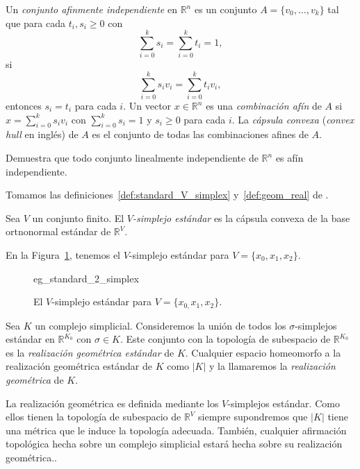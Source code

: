 \documentclass{standalone}
\begin{document}
	\begin{definition}\label{def:affine_ind_set}
		Un \emph{conjunto afinmente independiente} en $\mathbb{R}^{n}$ es un conjunto $A=\{v_{0},\ldots,v_{k}\}$ tal que para cada $t_{i},s_{i}\geq0$ con 
		\[
		\sum_{i=0}^{k}s_{i}=\sum_{i=0}^{k}t_{i}=1,
		\]si 
		\[
		\sum_{i=0}^{k}s_{i}v_{i}=\sum_{i=0}^{k}t_{i}v_{i},
		\]entonces $s_{i}=t_{i}$ para cada $i$. Un vector $x\in\mathbb{R}^{n}$ es una \emph{combinación afín} de $A$ si $x=\sum_{i=0}^{k}s_{i}v_{i}$ con $\sum_{i=0}^{k}s_{i}=1$ y $s_{i}\geq0$ para cada $i$. La \emph{cápsula convexa} (\emph{convex hull} en inglés) de $A$ es el conjunto de todas las combinaciones afines de $A$.
	\end{definition}
	
	\begin{exercise}
		Demuestra que todo conjunto linealmente independiente de $\mathbb{R}^{n}$ es afín independiente.
	\end{exercise}
	
	Tomamos las definiciones~\ref{def:standard_V_simplex} y~\ref{def:geom_real} de \cite[Section 2.2.1]{kozlov:2008:combinatorial:alg:topo}.
	
	\begin{definition}\label{def:standard_V_simplex}
		Sea $V$ un conjunto finito. El \emph{$V$-simplejo estándar} es la cápsula convexa de la base ortnonormal estándar de $\mathbb{R}^{V}$. 
	\end{definition}
	En la Figura~\ref{fig:eg_standard_2_simplex}, tenemos el $V$-simplejo estándar para $V=\{x_{0},x_{1},x_{2}\}$. 
	\begin{figure}
		\centering
		{eg_standard_2_simplex}
		\caption{El $V$-simplejo estándar para $V=\{x_{0,}x_{1},x_{2}\}$.}
		\label{fig:eg_standard_2_simplex}
	\end{figure}
	
	\begin{definition}\label{def:geom_real}
		Sea $K$ un complejo simplicial. Consideremos la unión de todos los $\sigma$-simplejos estándar en $\mathbb{R}^{K_{0}}$ con $\sigma\in K$. Este conjunto con la topología de subespacio de $\mathbb{R}^{K_{0}}$ es la \emph{realización geométrica estándar} de $K$.  Cualquier espacio homeomorfo a la realización geométrica estándar de $K$ como $|K|$ y la llamaremos la \emph{realización geométrica} de $K$.
	\end{definition}
	
	\begin{remark}\label{rem:geom_realization}
		La realización geométrica es definida mediante los $V$-simplejos estándar. Como ellos tienen la topología de subespacio de $\mathbb{R}^{V}$ siempre supondremos que $|K|$ tiene una métrica que le induce la topología adecuada. También, cualquier afirmación topológica hecha sobre un complejo simplicial estará hecha sobre su realización geométrica.. 
	\end{remark}
	
\end{document}
